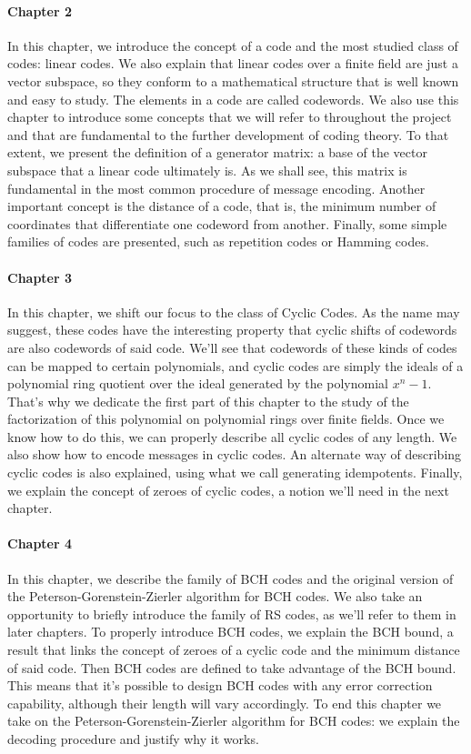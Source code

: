 \paragraph{Chapter 2} In this chapter, we introduce the concept of a code and the most studied class of codes: linear codes.
We also explain that linear codes over a finite field are just a vector subspace, so they conform to a mathematical structure that is well known and easy to study.
The elements in a code are called codewords.
We also use this chapter to introduce some concepts that we will refer to throughout the project and that are fundamental to the further development of coding theory.
To that extent, we present the definition of a generator matrix: a base of the vector subspace that a linear code ultimately is.
As we shall see, this matrix is fundamental in the most common procedure of message encoding.
Another important concept is the distance of a code, that is, the minimum number of coordinates that differentiate one codeword from another.
Finally, some simple families of codes are presented, such as repetition codes or Hamming codes.


\paragraph{Chapter 3} In this chapter, we shift our focus to the class of Cyclic Codes. 
As the name may suggest, these codes have the interesting property that cyclic shifts of codewords are also codewords of said code.
We'll see that codewords of these kinds of codes can be mapped to certain polynomials, and cyclic codes are simply the ideals of a polynomial ring quotient over the ideal generated by the polynomial \(x^n - 1\).
That's why we dedicate the first part of this chapter to the study of the factorization of this polynomial on polynomial rings over finite fields.
Once we know how to do this, we can properly describe all cyclic codes of any length.
We also show how to encode messages in cyclic codes.
An alternate way of describing cyclic codes is also explained, using what we call generating idempotents.
Finally, we explain the concept of zeroes of cyclic codes, a notion we'll need in the next chapter.

\paragraph{Chapter 4} In this chapter, we describe the family of BCH codes and the original version of the Peterson-Gorenstein-Zierler algorithm for BCH codes.
We also take an opportunity to briefly introduce the family of RS codes, as we'll refer to them in later chapters.
To properly introduce BCH codes, we explain the BCH bound, a result that links the concept of zeroes of a cyclic code and the minimum distance of said code.
Then BCH codes are defined to take advantage of the BCH bound.
This means that it's possible to design BCH codes with any error correction capability, although their length will vary accordingly.
To end this chapter we take on the Peterson-Gorenstein-Zierler algorithm for BCH codes: we explain the decoding procedure and justify why it works.

